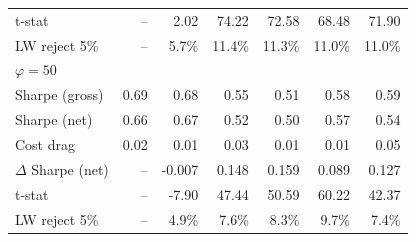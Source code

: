 \begin{tabular*}{\textwidth}{l@{\extracolsep{\fill}}rrrrrr}
t-stat & --\phantom{$^{***}$} & 2.02\phantom{$^{***}$} & 74.22\phantom{$^{***}$} & 72.58\phantom{$^{***}$} & 68.48\phantom{$^{***}$} & 71.90\phantom{$^{***}$} \\
LW reject 5\% & --\phantom{$^{***}$} & 5.7\%\phantom{$^{***}$} & 11.4\%\phantom{$^{***}$} & 11.3\%\phantom{$^{***}$} & 11.0\%\phantom{$^{***}$} & 11.0\%\phantom{$^{***}$} \\
\midrule
\multicolumn{7}{l}{\textit{$\varphi = 50$}} \\
\midrule
Sharpe (gross) & 0.69\phantom{$^{***}$} & 0.68\phantom{$^{***}$} & 0.55\phantom{$^{***}$} & 0.51\phantom{$^{***}$} & 0.58\phantom{$^{***}$} & 0.59\phantom{$^{***}$} \\
Sharpe (net) & 0.66\phantom{$^{***}$} & 0.67\phantom{$^{***}$} & 0.52\phantom{$^{***}$} & 0.50\phantom{$^{***}$} & 0.57\phantom{$^{***}$} & 0.54\phantom{$^{***}$} \\
Cost drag & 0.02\phantom{$^{***}$} & 0.01\phantom{$^{***}$} & 0.03\phantom{$^{***}$} & 0.01\phantom{$^{***}$} & 0.01\phantom{$^{***}$} & 0.05\phantom{$^{***}$} \\
$\Delta$ Sharpe (net) & --\phantom{$^{***}$} & -0.007\rlap{$^{***}$}\phantom{$^{***}$} & 0.148\rlap{$^{***}$}\phantom{$^{***}$} & 0.159\rlap{$^{***}$}\phantom{$^{***}$} & 0.089\rlap{$^{***}$}\phantom{$^{***}$} & 0.127\rlap{$^{***}$}\phantom{$^{***}$} \\
t-stat & --\phantom{$^{***}$} & -7.90\phantom{$^{***}$} & 47.44\phantom{$^{***}$} & 50.59\phantom{$^{***}$} & 60.22\phantom{$^{***}$} & 42.37\phantom{$^{***}$} \\
LW reject 5\% & --\phantom{$^{***}$} & 4.9\%\phantom{$^{***}$} & 7.6\%\phantom{$^{***}$} & 8.3\%\phantom{$^{***}$} & 9.7\%\phantom{$^{***}$} & 7.4\%\phantom{$^{***}$} \\
\bottomrule
\end{tabular*}

